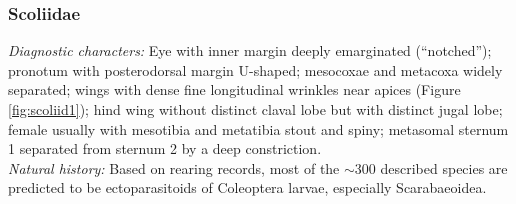 \documentclass[letterpaper, 11pt]{article}
\begin{document}
\subsubsection{Scoliidae}
\noindent{}\textit{Diagnostic characters:} Eye with inner margin deeply emarginated (``notched''); pronotum with posterodorsal margin U-shaped; mesocoxae and metacoxa widely separated; wings with dense fine longitudinal wrinkles near apices (Figure \ref{fig:scoliid1}); hind wing without distinct claval lobe but with distinct jugal lobe; female usually with mesotibia and metatibia stout and spiny; metasomal sternum 1 separated from sternum 2 by a deep constriction.\\

\noindent{}\textit{Natural history:} Based on rearing records, most of the $\sim$300 described species are predicted to be ectoparasitoids of Coleoptera larvae, especially Scarabaeoidea.\\
\end{document}
